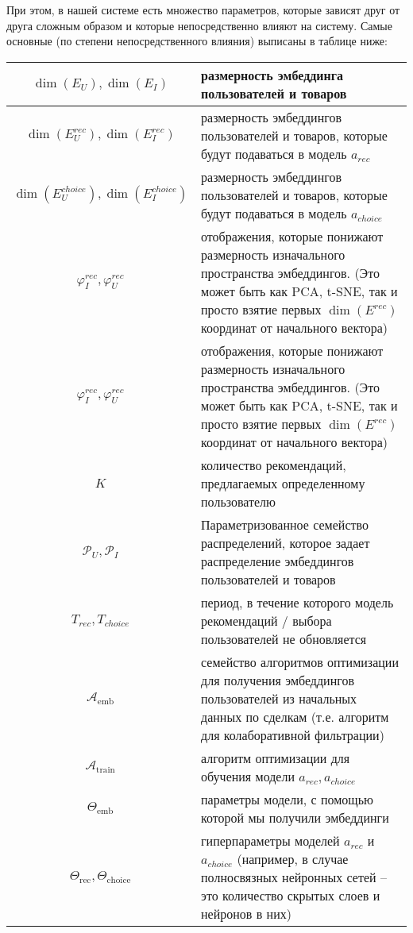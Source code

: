\documentclass{article}
\begin{document}
При этом, в нашей системе есть множество параметров, которые зависят друг от друга сложным образом и которые непосредственно влияют на систему. Самые основные (по степени непосредственного влияния) выписаны в таблице ниже: 


\begin{center}
\setlength{\tabcolsep}{12pt}
\renewcommand{\arraystretch}{1.8}

\begin{tabularx}{\textwidth}{|c|>{\raggedright\arraybackslash}X|}
\hline
$\dim(E_U), \dim(E_I)$ & размерность эмбеддинга пользователей и товаров  \\ \hline
$\dim(E_U^{rec}), \dim(E_I^{rec})$ & размерность эмбеддингов пользователей и товаров, которые будут подаваться в модель $a_{rec}$ \\ \hline
$\dim(E_U^{choice}), \dim(E_I^{choice})$ & размерность эмбеддингов пользователей и товаров, которые будут подаваться в модель $a_{choice}$ \\ \hline
$\varphi_I^{rec}, \varphi_{U}^{rec}$ & отображения, которые понижают размерность изначального пространства эмбеддингов. (Это может быть как PCA, t-SNE, так и просто взятие первых $\dim(E^{rec})$ координат от начального вектора) \\ \hline
$\varphi_I^{rec}, \varphi_{U}^{rec}$ & отображения, которые понижают размерность изначального пространства эмбеддингов. (Это может быть как PCA, t-SNE, так и просто взятие первых $\dim(E^{rec})$ координат от начального вектора) \\ \hline
$K$ & количество рекомендаций, предлагаемых определенному пользователю \\ \hline
$\mathcal{P}_U, \mathcal{P}_I$ & Параметризованное семейство распределений, которое задает распределение эмбеддингов пользователей и товаров  \\ \hline
$T_{rec}, T_{choice}$ & период, в течение которого модель рекомендаций / выбора пользователей не обновляется \\ \hline
$\mathcal{A}_{\text{emb}}$ & семейство алгоритмов оптимизации для получения эмбеддингов пользователей из начальных данных по сделкам (т.е. алгоритм для колаборативной фильтрации) \\ \hline
$\mathcal{A}_{\text{train}}$ & алгоритм оптимизации для обучения модели $a_{rec}, a_{choice}$ \\ \hline
$\Theta_{\text{emb}}$ & параметры модели, с помощью которой мы получили эмбеддинги \\ \hline
$\Theta_{\text{rec}}, \Theta_{\text{choice}}$ & гиперпараметры моделей $a_{rec}$ и $a_{choice}$ (например, в случае полносвязных нейронных сетей – это количество скрытых слоев и нейронов в них) \\ \hline
\end{tabularx}
\end{center}
\end{document}
